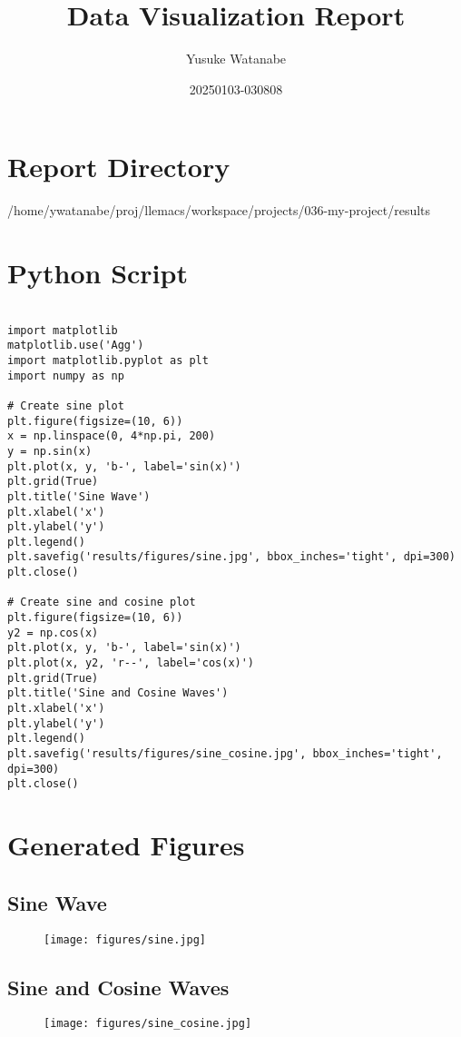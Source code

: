 \documentclass[11pt]{article}
\author{Yusuke Watanabe}
\date{20250103-030808}
\title{Data Visualization Report}
\begin{document}
\maketitle
\tableofcontents


\section{Report Directory}
\label{sec:org6bed88b}
/home/ywatanabe/proj/llemacs/workspace/projects/036-my-project/results

\section{Python Script}
\label{sec:org171944d}
\begin{verbatim}

import matplotlib
matplotlib.use('Agg')
import matplotlib.pyplot as plt
import numpy as np

# Create sine plot
plt.figure(figsize=(10, 6))
x = np.linspace(0, 4*np.pi, 200)
y = np.sin(x)
plt.plot(x, y, 'b-', label='sin(x)')
plt.grid(True)
plt.title('Sine Wave')
plt.xlabel('x')
plt.ylabel('y')
plt.legend()
plt.savefig('results/figures/sine.jpg', bbox_inches='tight', dpi=300)
plt.close()

# Create sine and cosine plot
plt.figure(figsize=(10, 6))
y2 = np.cos(x)
plt.plot(x, y, 'b-', label='sin(x)')
plt.plot(x, y2, 'r--', label='cos(x)')
plt.grid(True)
plt.title('Sine and Cosine Waves')
plt.xlabel('x')
plt.ylabel('y')
plt.legend()
plt.savefig('results/figures/sine_cosine.jpg', bbox_inches='tight', dpi=300)
plt.close()
\end{verbatim}

\section{Generated Figures}
\label{sec:org88fd550}
\subsection{Sine Wave}
\label{sec:orge039324}
\begin{figure}[H]
\centering
\texttt{[image: figures/sine.jpg]}
\end{figure}

\subsection{Sine and Cosine Waves}
\label{sec:org03f05af}
\begin{figure}[H]
\centering
\texttt{[image: figures/sine\_cosine.jpg]}
\end{figure}
\end{document}
